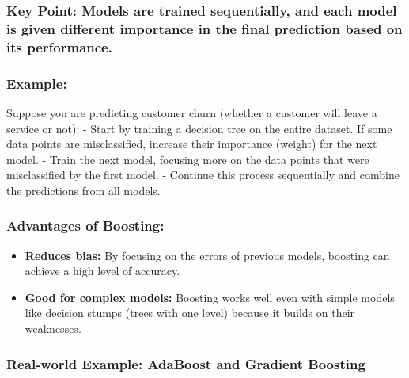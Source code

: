 \documentclass[12pt]{book}
\providecommand{\tightlist}{%
  \setlength{\itemsep}{0pt}\setlength{\parskip}{0pt}}
\begin{document}
\subsubsection{\texorpdfstring{\textbf{Key Point:} Models are trained
\textbf{sequentially}, and each model is given \textbf{different
importance} in the final prediction based on its
performance.}{Key Point: Models are trained sequentially, and each model is given different importance in the final prediction based on its performance.}}\label{key-point-models-are-trained-sequentially-and-each-model-is-given-different-importance-in-the-final-prediction-based-on-its-performance.}

\subsubsection{\texorpdfstring{\textbf{Example:}}{Example:}}\label{example-1}

Suppose you are predicting customer churn (whether a customer will leave
a service or not): - Start by training a decision tree on the entire
dataset. If some data points are misclassified, increase their
importance (weight) for the next model. - Train the next model, focusing
more on the data points that were misclassified by the first model. -
Continue this process sequentially and combine the predictions from all
models.

\subsubsection{\texorpdfstring{\textbf{Advantages of
Boosting:}}{Advantages of Boosting:}}\label{advantages-of-boosting}

\begin{itemize}
\tightlist
\item
  \textbf{Reduces bias:} By focusing on the errors of previous models,
  boosting can achieve a high level of accuracy.
\item
  \textbf{Good for complex models:} Boosting works well even with simple
  models like decision stumps (trees with one level) because it builds
  on their weaknesses.
\end{itemize}

\subsubsection{\texorpdfstring{\textbf{Real-world Example: AdaBoost and
Gradient
Boosting}}{Real-world Example: AdaBoost and Gradient Boosting}}\label{real-world-example-adaboost-and-gradient-boosting}
\end{document}
